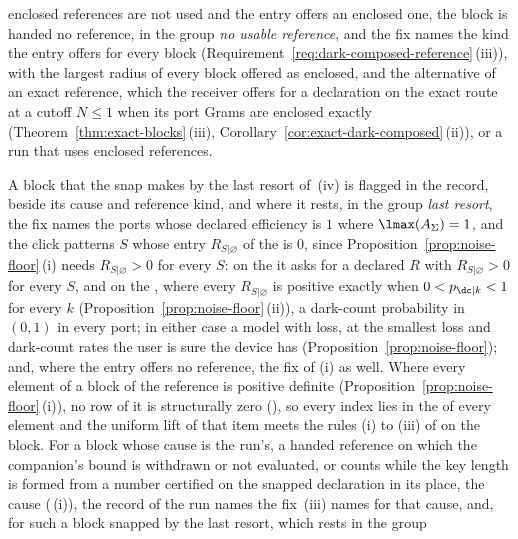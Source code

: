\begin{requirement}
\begin{enumerate}[label=(\roman*),leftmargin=2.4em]
  enclosed references are not used and the entry offers an enclosed one, the
  block is handed no reference, in the group \emph{no usable reference}, and
  the fix names the kind the entry offers for every block
  (Requirement~\ref{req:dark-composed-reference}\,(iii)), with the largest
  radius of every block offered as enclosed, and the alternative of an exact
  reference, which the receiver offers for a declaration on the exact route
  at a cutoff $N\le1$ when its port Grams are enclosed exactly
  (Theorem~\ref{thm:exact-blocks}\,(iii),
  Corollary~\ref{cor:exact-dark-composed}\,(ii)), or a run that uses
  enclosed references.
\end{enumerate}
A block that the snap makes by the last resort of
\,(iv) is flagged
 in the record, beside its cause and reference
kind, and where it rests, in the group \emph{last resort}, the fix names the
ports whose declared efficiency is $1$ where $\lmax(A_\Sigma)=1$, and the
click patterns $S$ whose entry $R_{S|\varnothing}$ of the
 is $0$, since Proposition~\ref{prop:noise-floor}\,(i)
needs $R_{S|\varnothing}>0$ for every $S$: on the
 it asks for a declared $R$ with
$R_{S|\varnothing}>0$ for every $S$, and on the
, where every $R_{S|\varnothing}$ is positive
exactly when $0<p_{\dc|k}<1$ for every $k$
(Proposition~\ref{prop:noise-floor}\,(ii)), a dark-count probability in
$(0,1)$ in every port; in either case a model with loss, at the smallest loss
and dark-count rates the user is sure the device has
(Proposition~\ref{prop:noise-floor}); and, where the entry offers no
reference, the fix of (i) as well. Where every element of a block of the
reference is positive definite (Proposition~\ref{prop:noise-floor}\,(i)), no
row of it is structurally zero (), so every index
lies in the  of every element and the uniform lift
of that item meets the rules (i) to (iii) of
 on the block. For a block whose
cause is the run's, a handed reference on which the companion's bound is
withdrawn or not evaluated, or counts while the key length is formed from a
number certified on the snapped declaration in its place, the cause
(\,(i)), the record of
the run names the fix
\,(iii) names for that cause, and, for
such a block snapped by the last resort, which rests in the group

\end{requirement}
